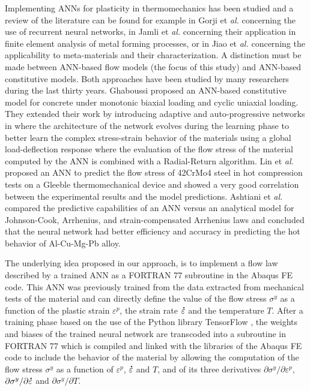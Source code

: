 \documentclass[algorithms,article,submit,pdftex,moreauthors]{Definitions/mdpi}
\makeatletter
\DeclareRobustCommand{\mdot}[1]{\accentset{\mbox{\bfseries .}}{#1}}
\DeclareRobustCommand{\eal}{et \emph{al.}\@\xspace}
\makeatother
\begin{document}
Implementing ANNs for plasticity in thermomechanics has been studied and a review of the literature can be found for example in Gorji \eal \cite{Gorji-2020} concerning the use of recurrent neural networks, in Jamli \eal \cite{Jamli-2019-SNN} concerning their application in finite element analysis of metal forming processes, or in Jiao \eal \cite{Jiao-2020} concerning the applicability to meta-materials and their characterization.
A distinction must be made between ANN-based flow models (the focus of this study) and ANN-based constitutive models.
Both approaches have been studied by many researchers during the last thirty years.
Ghaboussi \cite{Ghaboussi-1991} proposed an ANN-based constitutive model for concrete under monotonic biaxial loading and cyclic uniaxial loading.
They extended their work by introducing adaptive and auto-progressive networks in \cite{Ghaboussi-1998, Ghaboussi-1998-NNA} where the architecture of the network evolves during the learning phase to better learn the complex stress-strain behavior of the materials using a global load-deflection response where the evaluation of the flow stress of the material computed by the ANN is combined with a Radial-Return algorithm.
Lin \eal \cite{Lin-2008} proposed an ANN to predict the flow stress of 42CrMo4 steel in hot compression tests on a Gleeble thermomechanical device and showed a very good correlation between the experimental results and the model predictions.
Ashtiani \eal \cite{Ashtiani-2016} compared the predictive capabilities of an ANN versus an analytical model for Johnson-Cook, Arrhenius, and strain-compensated Arrhenius laws and concluded that the neural network had better efficiency and accuracy in predicting the hot behavior of Al-Cu-Mg-Pb alloy.

The underlying idea proposed in our approach, is to implement a flow law described by a trained ANN as a FORTRAN 77 subroutine in the Abaqus FE code.
This ANN was previously trained from the data extracted from mechanical tests of the material and can directly define the value of the flow stress $\sigma^y$ as a function of the plastic strain $\varepsilon^p$, the strain rate $\mdot\varepsilon$ and the temperature $T$.
After a training phase based on the use of the Python library TensorFlow \cite{Abadi-2016, Mattmann-2020}, the weights and biases of the trained neural network are transcoded into a subroutine in FORTRAN 77 which is compiled and linked with the libraries of the Abaqus FE code to include the behavior of the material by allowing the computation of the flow stress $\sigma^y$ as a function of $\varepsilon^p$, $\mdot\varepsilon$ and $T$, and of its three derivatives $\partial\sigma^y/\partial\varepsilon^p$, $\partial\sigma^y/\partial\mdot\varepsilon$ and $\partial\sigma^y/\partial T$.
\end{document}
